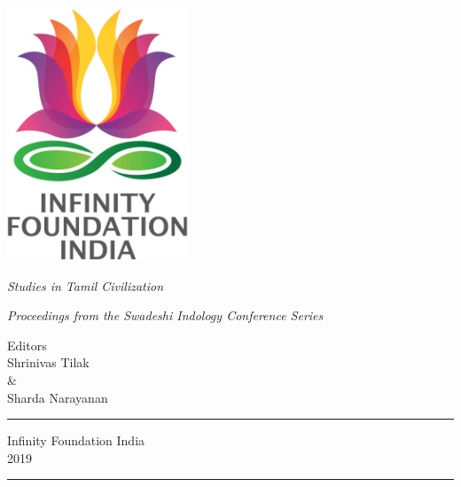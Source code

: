 \thispagestyle{empty}
\begin{center}
\includegraphics[scale=0.3]{images/logo.png}
\bigskip

{\fontsize{10}{14}\selectfont\sl
Studies in Tamil Civilization
}

\bigskip
\end{center}
\medskip

\begin{center}
{\fontsize{20}{24}\selectfont {L\,a\,n\,d\;\; o\,f\;\; D\,h\,a\,r\,m\,a}}
\bigskip

{\sl\small Proceedings from the Swadeshi Indology Conference Series}
\vfill


{\fontsize{14}{18}\selectfont 
Editors\\[2pt]
Shrinivas Tilak\\ 
\&\\ 
Sharda Narayanan\par
}
\vfill

\rule{5cm}{1pt}

{\fontsize{12}{14}\selectfont
Infinity Foundation India\\[4pt]
2019}

\rule{5cm}{1pt}
\end{center}




